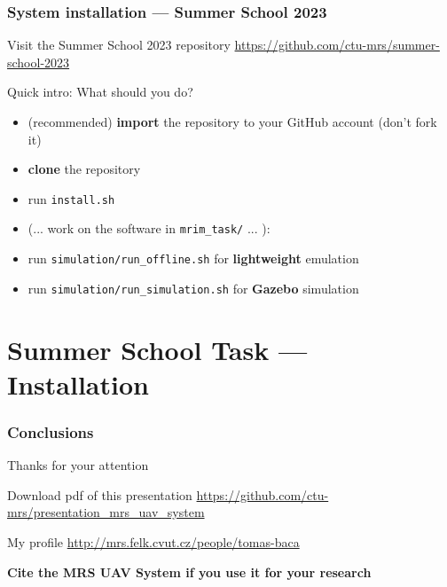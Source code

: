 \documentclass[aspectratio=169]{beamer}
\begin{document}
\begin{frame}
\frametitle{System installation --- Summer School 2023}

\begin{block}{Visit the Summer School 2023 repository}
  \centering
  \Large\url{https://github.com/ctu-mrs/summer-school-2023}
\end{block}

\begin{block}{Quick intro: What should you do?}
  \begin{itemize}
    \item (recommended) \textbf{import} the repository to your GitHub account (don't fork it)
    \item \textbf{clone} the repository
    \item run \texttt{install.sh}
    \item (... work on the software in \texttt{mrim\_task/} ... ):
    \item run \texttt{simulation/run\_offline.sh} for \textbf{lightweight} emulation
    \item run \texttt{simulation/run\_simulation.sh} for \textbf{Gazebo} simulation
  \end{itemize}
\end{block}

\end{frame}


\section{Summer School Task --- Installation}


\begin{frame}
  \frametitle{Conclusions}

  \begin{center}
    \huge Thanks for your attention\\
  \end{center}

  \begin{block}{Download pdf of this presentation}
    \centering
    \Large\url{https://github.com/ctu-mrs/presentation_mrs_uav_system}
  \end{block}

  \begin{block}{My profile}
    \centering
    \Large\url{http://mrs.felk.cvut.cz/people/tomas-baca}
  \end{block}

  \begin{block}{\centering \textbf{Cite the MRS UAV System if you use it for your research}}
    \small {}
  \end{block}

\end{frame}
\end{document}
